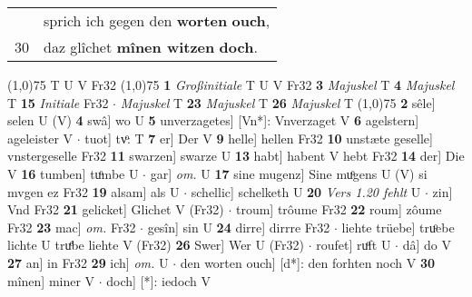 \documentclass[8pt,a4paper,notitlepage]{article}
\begin{document}
\begin{table}[ht]
\begin{minipage}[t]{0.5\linewidth}
\begin{tabular}{rl}
 & sprich ich gegen den \textbf{worten} \textbf{ouch},\\ 
30 & daz glîchet \textbf{mînen witzen} \textbf{doch}.\\ 
\end{tabular}
\scriptsize
\line(1,0){75} \newline
T U V Fr32 \newline
\line(1,0){75} \newline
\textbf{1} \textit{Großinitiale} T U V Fr32  \textbf{3} \textit{Majuskel} T  \textbf{4} \textit{Majuskel} T  \textbf{15} \textit{Initiale} Fr32   $\cdot$ \textit{Majuskel} T  \textbf{23} \textit{Majuskel} T  \textbf{26} \textit{Majuskel} T  \newline
\line(1,0){75} \newline
\textbf{2} sêle] selen U (V) \textbf{4} swâ] wo U \textbf{5} unverzagetes] [Vn*]: Vnverzaget V \textbf{6} agelstern] ageleister V  $\cdot$ tuot] tvͦ: T \textbf{7} er] Der V \textbf{9} helle] hellen Fr32 \textbf{10} unstæte geselle] vnstergeselle Fr32 \textbf{11} swarzen] swarze U \textbf{13} habt] habent V hebt Fr32 \textbf{14} der] Die V \textbf{16} tumben] tuͦmbe U  $\cdot$ gar] \textit{om.} U \textbf{17} sine mugenz] Sine muͦgens U (V) si mvgen ez Fr32 \textbf{19} alsam] als U  $\cdot$ schellic] schelketh U \textbf{20} \textit{Vers 1.20 fehlt} U   $\cdot$ zin] Vnd Fr32 \textbf{21} gelicket] Glichet V (Fr32)  $\cdot$ troum] trôume Fr32 \textbf{22} roum] zôume Fr32 \textbf{23} mac] \textit{om.} Fr32  $\cdot$ gesîn] sin U \textbf{24} dirre] dirrre Fr32  $\cdot$ liehte trüebe] truͦebe lichte U truͤbe liehte V (Fr32) \textbf{26} Swer] Wer U (Fr32)  $\cdot$ roufet] ruͦft U  $\cdot$ dâ] do V \textbf{27} an] in Fr32 \textbf{29} ich] \textit{om.} U  $\cdot$ den worten ouch] [d*]: den forhten noch V \textbf{30} mînen] miner V  $\cdot$ doch] [*]: iedoch V \newline
\end{minipage}
\end{table}
\end{document}
